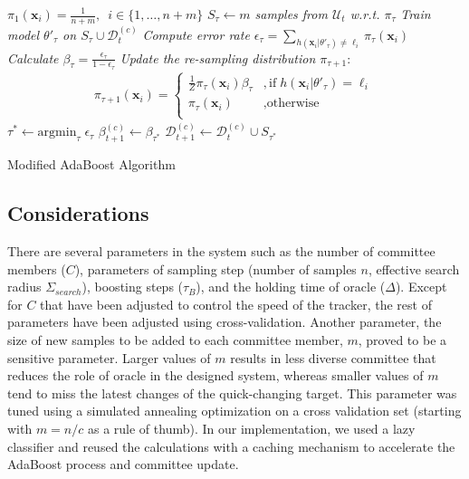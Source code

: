 \documentclass[10pt, conference, compsocconf]{IEEEtran}
\begin{document}
\begin{algorithm}[!t]
\DontPrintSemicolon
{}
\BlankLine
\emph{$\pi_1(\mathbf{x}_i) = \frac{1}{n+m} , \,\,\,  i \in \{1,\ldots,n+m\}$}\;
{
\emph{$S_\tau \leftarrow m$ samples from $\mathcal{U}_t$ w.r.t. $\pi_\tau$  }\;
\emph{Train model $\theta'_\tau$ on $S_\tau \cup \mathcal{D}_{t}^{(c)}$}\;
\emph{Compute error rate $\epsilon_\tau = \sum_{h(\mathbf{x}_i|\theta'_\tau) \neq \ell_i} \pi_\tau(\mathbf{x}_i)$}\;
\emph{Calculate $\beta_\tau = \frac{\epsilon_\tau}{1- \epsilon_\tau}$}\;
\emph{Update the re-sampling distribution $\pi_{\tau+1}$}:
\begin{align}
\pi_{\tau+1}(\mathbf{x}_i) = 
\begin{cases}
  \frac{1}{Z}\pi_{\tau}(\mathbf{x}_i)\beta_\tau     & ,\mathrm{if} \; h(\mathbf{x}_i|\theta'_\tau) = \ell_i  \nonumber  \\
  \pi_{\tau}(\mathbf{x}_i)                             & ,\text{otherwise} \nonumber \\
\end{cases}
\end{align}
}
\emph{$\tau^* \leftarrow \mathrm{argmin}_\tau \; \epsilon_\tau$}\;
\emph{$\beta_{t+1}^{(c)} \leftarrow \beta_{\tau^*}$}\;
\emph{$\mathcal{D}_{t+1}^{(c)} \leftarrow \mathcal{D}_{t}^{(c)} \cup S_{\tau^*}$}\;

\BlankLine
\caption{Modified AdaBoost Algorithm}
\label{alg:boost}
\end{algorithm}

\subsection{Considerations}
\label{sec:consider}
There are several parameters in the system such as the number of committee members ($C$), parameters of sampling step (number of samples $n$, effective search radius $\Sigma_{search}$), boosting steps ($\tau_B$), and the holding time of oracle ($\Delta$). Except for $C$ that have been adjusted to control the speed of the tracker, the rest of parameters have been adjusted using cross-validation. Another parameter, the size of new samples to be added to each committee member, $m$, proved to be a sensitive parameter. Larger values of $m$ results in less diverse committee that reduces the role of oracle in the designed system, whereas smaller values of $m$ tend to miss the latest changes of the quick-changing target. This parameter was tuned using a simulated annealing optimization on a cross validation set (starting with $m=n/c$ as a rule of thumb). In our implementation, we used a lazy classifier and reused the calculations with a caching mechanism to accelerate the AdaBoost process and committee update. 
\end{document}
